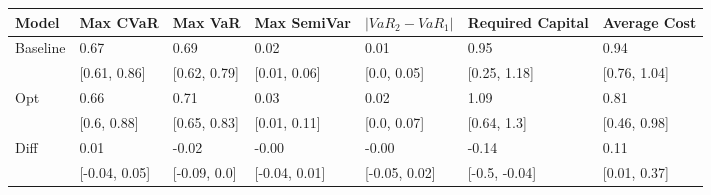 \begin{tabular}{lllllll}
\toprule
   Model &      Max CVaR &      Max VaR &   Max SemiVar & $|VaR_2 - VaR_1|$ & Required Capital & Average Cost \\
\midrule
Baseline &          0.67 &         0.69 &          0.02 &              0.01 &             0.95 &         0.94 \\
         &  [0.61, 0.86] & [0.62, 0.79] &  [0.01, 0.06] &       [0.0, 0.05] &     [0.25, 1.18] & [0.76, 1.04] \\
     Opt &          0.66 &         0.71 &          0.03 &              0.02 &             1.09 &         0.81 \\
         &   [0.6, 0.88] & [0.65, 0.83] &  [0.01, 0.11] &       [0.0, 0.07] &      [0.64, 1.3] & [0.46, 0.98] \\
    Diff &          0.01 &        -0.02 &         -0.00 &             -0.00 &            -0.14 &         0.11 \\
         & [-0.04, 0.05] & [-0.09, 0.0] & [-0.04, 0.01] &     [-0.05, 0.02] &    [-0.5, -0.04] & [0.01, 0.37] \\
\bottomrule
\end{tabular}
